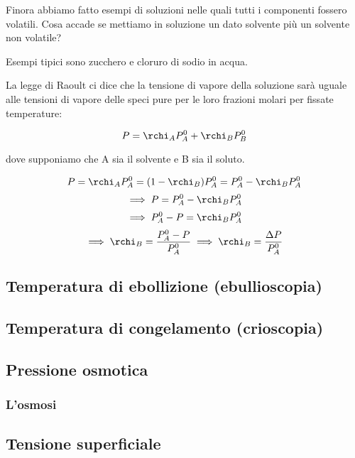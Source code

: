 Finora abbiamo fatto esempi di soluzioni nelle quali tutti i componenti fossero volatili. Cosa accade se mettiamo in soluzione un dato solvente più un solvente non volatile?

Esempi tipici sono zucchero e cloruro di sodio in acqua.

La legge di Raoult ci dice che la tensione di vapore della soluzione sarà uguale alle tensioni di vapore delle speci pure per le loro frazioni molari per fissate temperature:

$$P=\rchi_AP^0_A + \rchi_BP^0_B$$

dove supponiamo che A sia il solvente e B sia il soluto.

$$P=\rchi_AP^0_A=(1- \rchi_B)P^0_A=P^0_A - \rchi_BP^0_A$$
$$\implies P=P^0_A - \rchi_BP^0_A$$
$$\implies P^0_A - P = \rchi_BP^0_A$$
$$\implies \rchi_B=\frac{P^0_A - P}{P^0_A} \implies \rchi_B=\frac{\Delta P}{P^0_A}$$
\subsection{Temperatura di ebollizione (ebullioscopia)}
\subsection{Temperatura di congelamento (crioscopia)}
\subsection{Pressione osmotica}
\subsubsection{L'osmosi}
\subsection{Tensione superficiale}